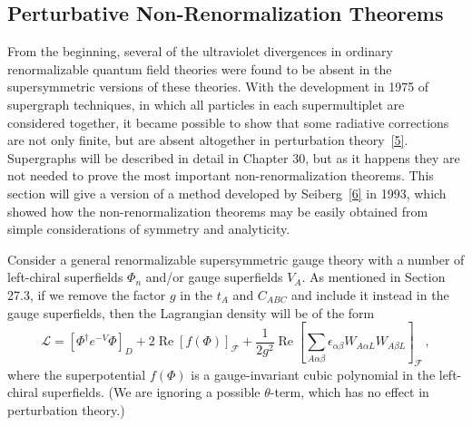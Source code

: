 
\subsection{Perturbative Non-Renormalization Theorems}

From the beginning, several of the ultraviolet divergences in ordinary
renormalizable quantum field theories were found to be absent in the
supersymmetric versions of these theories. With the development in 1975 of
supergraph techniques, in which all particles in each supermultiplet are
considered together, it became possible to show that some radiative
corrections are not only finite, but are absent altogether in perturbation
theory~\hyperref[ch27-ref-5]{[5]}. Supergraphs will be described in detail in
Chapter 30, but as it happens they are not needed to prove the most important
non-renormalization theorems. This section will give a version of a method
developed by Seiberg~\hyperref[ch27-ref-6]{[6]} in 1993, which showed how the
non-renormalization theorems may be easily obtained from simple
considerations of symmetry and analyticity.

Consider a general renormalizable supersymmetric gauge theory with a number
of left-chiral superfields \(\Phi_n\) and/or gauge superfields \(V_A\). As
mentioned in Section 27.3, if we remove the factor \(g\) in the \(t_A\) and
\(C_{ABC}\) and include it instead in the gauge superfields, then the
Lagrangian density will be of the form
\begin{equation}
  \mathcal{L}
  =
  \left[\Phi^\dagger e^{-V}\Phi\right]_D
  +2\operatorname{Re}\left[f(\Phi)\right]_{\mathcal{F}}
  +\frac{1}{2g^2}\operatorname{Re}
  \left[
    \sum_{A\alpha\beta}
    \epsilon_{\alpha\beta}W_{A\alpha L}W_{A\beta L}
  \right]_{\mathcal{F}}\,,
  \tag{27.6.1}\label{eq:27.6.1}
\end{equation}
where the superpotential \(f(\Phi)\) is a gauge-invariant cubic polynomial in
the left-chiral superfields. (We are ignoring a possible \(\theta\)-term,
which has no effect in perturbation theory.)

